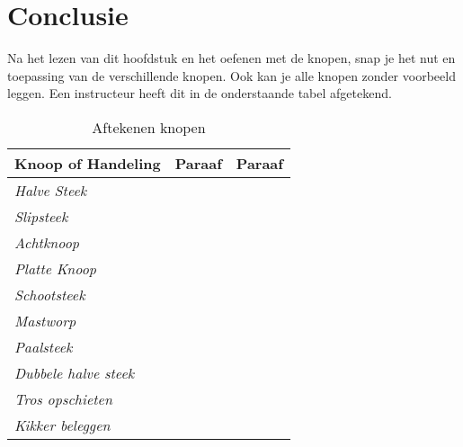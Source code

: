 \section{Conclusie}
Na het lezen van dit hoofdstuk en het oefenen met de knopen, snap je het nut en toepassing van de verschillende knopen. Ook kan je alle knopen zonder voorbeeld leggen. Een instructeur heeft dit in de onderstaande tabel afgetekend.
\vspace{2cm}
\begin{table}[H]
\centering
\caption{Aftekenen knopen}
\label{my-label}
\begin{tabular}{|l|l|l|}
\hline
\textbf{Knoop of Handeling}  & \textbf{Paraaf} & \textbf{Paraaf} \\ \hline
\textit{Halve Steek}         &                 &                 \\ \hline
\textit{Slipsteek}          &                 &                 \\ \hline
\textit{Achtknoop}           &                 &                 \\ \hline
\textit{Platte Knoop}        &                 &                 \\ \hline
\textit{Schootsteek}        &                 &                 \\ \hline
\textit{Mastworp}            &                 &                 \\ \hline
\textit{Paalsteek}           &                 &                 \\ \hline
\textit{Dubbele halve steek} &                 &                 \\ \hline
\textit{Tros opschieten}     &                 &                 \\ \hline
\textit{Kikker beleggen}     &                 &                 \\ \hline
\end{tabular}
\end{table}
